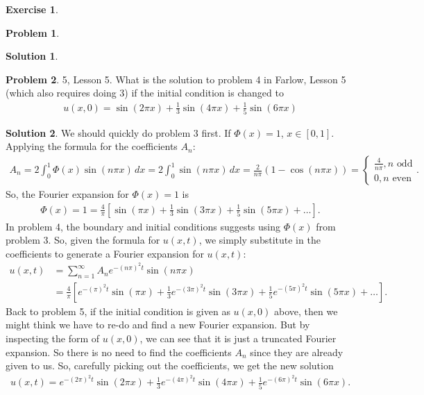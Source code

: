 \documentclass{book}
\theoremstyle{definition}
\newtheorem*{prob*}{Problem}
\newtheorem*{exer*}{Exercise}
\newtheorem*{sln*}{Solution}
\begin{document}
\begin{exer*}
\begin{prob*}
\begin{sln*}
		\end{sln*}
	\end{prob*}
	\newpage
	\begin{prob*}5, Lesson 5. What is the solution to problem 4 in Farlow, Lesson 5 (which also requires doing 3) if the initial condition is changed to 
		\begin{align*}
		u(x,0) = \sin(2\pi x) + \frac{1}{3}\sin(4\pi x) + \frac{1}{5}\sin(6\pi x)
		\end{align*}
		\begin{sln*}
			We should quickly do problem 3 first. If $\Phi(x) = 1$, $x\in[0,1]$. Applying the formula for the coefficients $A_n$:
			\begin{align*}
			A_n = 2\int_0^1\Phi(x)\sin(n\pi x)\,dx = 2\int_0^1\sin(n\pi x)\,dx = \frac{2}{n\pi}(1-\cos(n\pi x)) = \begin{cases}
			\frac{4}{n\pi}, n \text{ odd}\\
			0, n\text{ even}
			\end{cases}.
			\end{align*}
			So, the Fourier expansion for $\Phi(x) = 1$ is
			\begin{align*}
			\Phi(x) =1 = \frac{4}{\pi}\left[\sin(\pi x) + \frac{1}{3}\sin(3\pi x) + \frac{1}{5}\sin(5\pi x)+\dots \right].
			\end{align*}
			In problem 4, the boundary and initial conditions suggests using $\Phi(x)$ from problem 3. So, given the formula for $u(x,t)$, we simply substitute in the coefficients to generate a Fourier expansion for $u(x,t)$:
			\begin{align*}
			u(x,t) &= \sum_{n=1}^{\infty}A_n e^{-(n\pi)^2t}\sin(n\pi x)\\
			&= \frac{4}{\pi}\left[ e^{-(\pi)^2t}\sin(\pi x) + \frac{1}{3}e^{-(3\pi)^2t}\sin(3\pi x)
			+ \frac{1}{5}e^{-(5\pi)^2t}\sin(5\pi x)+\dots\right].
			\end{align*}
			Back to problem 5, if the initial condition is given as $u(x,0)$ above, then we might think we have to re-do and find a new Fourier expansion. But by inspecting the form of $u(x,0)$, we can see that it is just a truncated Fourier expansion. So there is no need to find the coefficients $A_n$ since they are already given to us. So, carefully picking out the coefficients, we get the new solution
			\begin{align*}
			u(x,t) = e^{-(2\pi)^2t}\sin(2\pi x) + \frac{1}{3}e^{-(4\pi)^2t}\sin(4\pi x) + \frac{1}{5}e^{-(6\pi)^2t}\sin(6\pi x).
			\end{align*}
		\end{sln*}
	\end{prob*}
\end{exer*}
\end{document}
